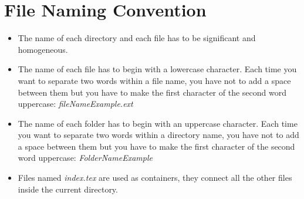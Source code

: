 \documentclass[12pt]{article}
\begin{document}
\section{File Naming Convention}
\begin{itemize}
  \item The name of each directory and each file has to be significant and homogeneous.
  \item The name of each file has to begin with a lowercase character. Each time you want to separate two words within a file name, you have not to add a space between them but you have to make the first character of the second word uppercase: \textit{fileNameExample.ext}
  \item The name of each folder has to begin with an uppercase character. Each time you want to separate two words within a directory name, you have not to add a space between them but you have to make the first character of the second word uppercase: \textit{FolderNameExample}
   \item Files named \textit{index.tex} are used as containers, they connect all the other files inside the current directory.
\end{itemize}
\end{document}
